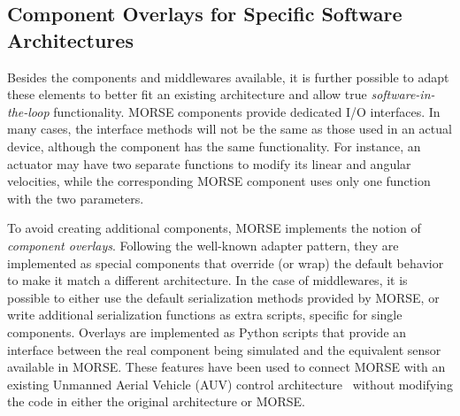 \documentclass{llncs}
\newcommand{\serge}[1]{\nb{Serge}{blue}{#1}}
\begin{document}
\subsection{Component Overlays for Specific Software Architectures}
\label{section:overlays}


Besides the components and middlewares available, it is
further possible to adapt these elements to better fit an existing
architecture and allow true \emph{software-in-the-loop} functionality.
MORSE components provide dedicated I/O interfaces. In
many cases, the interface methods will not be the same as those used in an
actual device, although the component has the same functionality.
For instance, an actuator may have two separate functions to modify its linear
and angular velocities, while the corresponding MORSE component uses only one
function with the two parameters.

To avoid creating additional components,
MORSE implements the notion of \emph{component overlays}. Following
the well-known adapter pattern, they are implemented as
special components that override (or wrap) the default
behavior to make it match a different architecture.
In the case of middlewares, it is possible to either use the default
serialization methods provided by MORSE, or write additional serialization
functions as extra scripts, specific for single components.
Overlays are implemented as Python scripts that provide an interface between
the real component being simulated and the equivalent sensor available in
MORSE.
These features have been used to connect MORSE with an existing
Unmanned Aerial Vehicle (AUV) control architecture~\cite{barbier2011}
without modifying the code in either the original architecture or MORSE.
\end{document}
